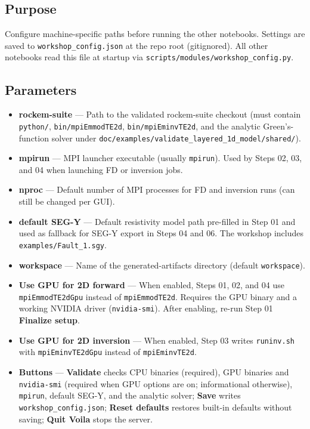 \documentclass[11pt,a4paper]{article}
\begin{document}
\subsection{Purpose}

Configure machine-specific paths before running the other notebooks. Settings are saved to \texttt{workshop\_config.json} at the repo root (gitignored). All other notebooks read this file at startup via \texttt{scripts/modules/workshop\_config.py}.

\subsection{Parameters}

\begin{itemize}
  \item \textbf{rockem-suite} — Path to the validated rockem-suite checkout (must contain \texttt{python/}, \texttt{bin/mpiEmmodTE2d}, \texttt{bin/mpiEminvTE2d}, and the analytic Green's-function solver under \texttt{doc/examples/validate\_layered\_1d\_model/shared/}).
  \item \textbf{mpirun} — MPI launcher executable (usually \texttt{mpirun}). Used by Steps 02, 03, and 04 when launching FD or inversion jobs.
  \item \textbf{nproc} — Default number of MPI processes for FD and inversion runs (can still be changed per GUI).
  \item \textbf{default SEG-Y} — Default resistivity model path pre-filled in Step 01 and used as fallback for SEG-Y export in Steps 04 and 06. The workshop includes \texttt{examples/Fault\_1.sgy}.
  \item \textbf{workspace} — Name of the generated-artifacts directory (default \texttt{workspace}).
  \item \textbf{Use GPU for 2D forward} — When enabled, Steps 01, 02, and 04 use \texttt{mpiEmmodTE2dGpu} instead of \texttt{mpiEmmodTE2d}. Requires the GPU binary and a working NVIDIA driver (\texttt{nvidia-smi}). After enabling, re-run Step 01 \textbf{Finalize setup}.
  \item \textbf{Use GPU for 2D inversion} — When enabled, Step 03 writes \texttt{runinv.sh} with \texttt{mpiEminvTE2dGpu} instead of \texttt{mpiEminvTE2d}.
  \item \textbf{Buttons} — \textbf{Validate} checks CPU binaries (required), GPU binaries and \texttt{nvidia-smi} (required when GPU options are on; informational otherwise), \texttt{mpirun}, default SEG-Y, and the analytic solver; \textbf{Save} writes \texttt{workshop\_config.json}; \textbf{Reset defaults} restores built-in defaults without saving; \textbf{Quit Voila} stops the server.
\end{itemize}
\end{document}
